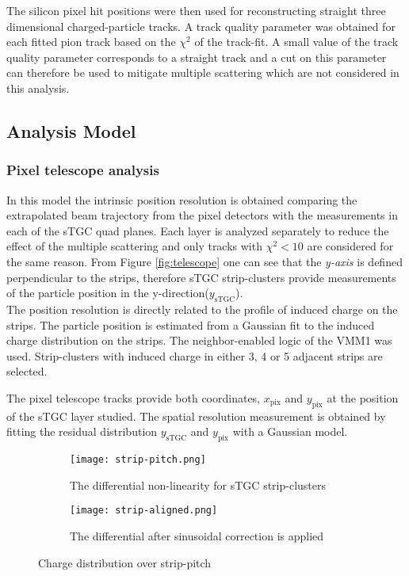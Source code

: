 The silicon pixel hit positions were then used for reconstructing straight three dimensional charged-particle tracks.  A
track quality parameter was obtained for each fitted pion track based on the $\chi^2$ of the track-fit. A small value of
the track quality parameter corresponds to a straight track and a cut on this parameter can therefore be used to
mitigate multiple scattering which are not considered in this analysis.\par


\subsection{Analysis Model}


\subsubsection{Pixel telescope analysis}


In this model the intrinsic position resolution is obtained comparing the extrapolated beam trajectory from the pixel
detectors with the measurements in each of the sTGC quad planes. Each layer is analyzed separately to reduce the effect
of the multiple scattering and only tracks with $\chi^2<10$ are considered for the same reason. From Figure
\ref{fig:telescope} one can see that the {\it y-axis} is defined perpendicular to the strips, therefore sTGC
strip-clusters provide measurements of the particle position in the y-direction($y_{\mathrm{sTGC}}$).\\

The position resolution is directly related to the profile of induced charge on the strips. The particle position is
estimated from a Gaussian fit to the induced charge distribution on the strips. The neighbor-enabled logic of the VMM1
was used. Strip-clusters with induced charge in either 3, 4 or 5 adjacent strips are selected.\par
	
The pixel telescope tracks provide both coordinates, $x_{\mathrm{pix}}$ and $y_{\mathrm{pix}}$ at the position of the
sTGC layer studied. The spatial resolution measurement is obtained by fitting the residual distribution
$y_{\mathrm{sTGC}}$  and $y_{\mathrm{pix}}$ with a Gaussian model.\par


\begin{figure}[ht]
	\centering
	\hspace*{\fill}
	\begin{subfigure}[b]{0.45\textwidth}
		\centering
		\texttt{[image: strip-pitch.png]}
		\caption{The differential non-linearity for sTGC strip-clusters}\label{fig:pitchfit}
	\end{subfigure}
	\hfill
	\begin{subfigure}[b]{0.45\textwidth}
		\centering
		\texttt{[image: strip-aligned.png]}
		\caption{The differential after sinusoidal correction is applied}\label{fig:pitchaligned}
	\end{subfigure}
	\hspace*{\fill}
	\caption{Charge distribution over strip-pitch}\label{fig:strip-pitch}
\end{figure}


